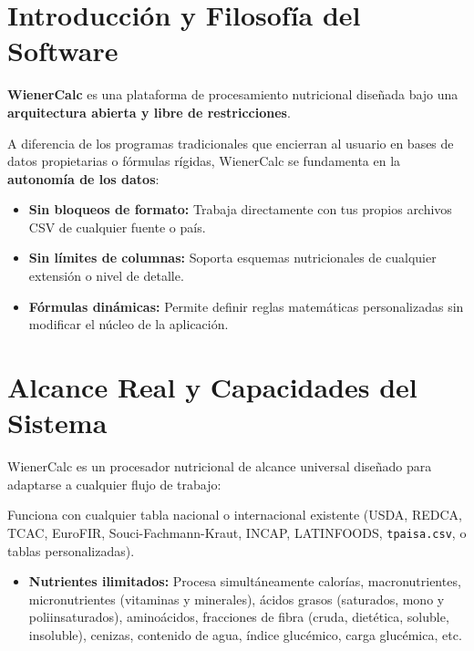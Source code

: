 \documentclass[11pt,a4paper]{article}
\begin{document}
\vspace{0.4cm}

\section{Introducción y Filosofía del Software}

\textbf{WienerCalc} es una plataforma de procesamiento nutricional diseñada bajo una \textbf{arquitectura abierta y libre de restricciones}.

A diferencia de los programas tradicionales que encierran al usuario en bases de datos propietarias o fórmulas rígidas, WienerCalc se fundamenta en la \textbf{autonomía de los datos}:
\begin{itemize}[label=\textcolor{aeroemerald}{$\bullet$}]
    \item \textbf{Sin bloqueos de formato:} Trabaja directamente con tus propios archivos CSV de cualquier fuente o país.
    \item \textbf{Sin límites de columnas:} Soporta esquemas nutricionales de cualquier extensión o nivel de detalle.
    \item \textbf{Fórmulas dinámicas:} Permite definir reglas matemáticas personalizadas sin modificar el núcleo de la aplicación.
\end{itemize}

\vspace{0.4cm}

\section{Alcance Real y Capacidades del Sistema}

WienerCalc es un procesador nutricional de alcance universal diseñado para adaptarse a cualquier flujo de trabajo:

\begin{glassbox}
Funciona con cualquier tabla nacional o internacional existente (USDA, REDCA, TCAC, EuroFIR, Souci-Fachmann-Kraut, INCAP, LATINFOODS, \texttt{tpaisa.csv}, o tablas personalizadas).
\begin{itemize}[label=\textcolor{aeroemerald}{$\checkmark$}]
    \item \textbf{Nutrientes ilimitados:} Procesa simultáneamente calorías, macronutrientes, micronutrientes (vitaminas y minerales), ácidos grasos (saturados, mono y poliinsaturados), aminoácidos, fracciones de fibra (cruda, dietética, soluble, insoluble), cenizas, contenido de agua, índice glucémico, carga glucémica, etc.
\end{itemize}
\end{glassbox}
\end{document}
